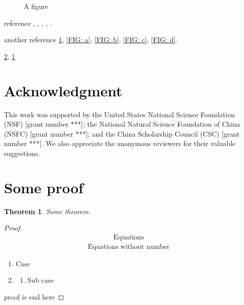 \documentclass[3p,review,a4paper]{elsarticle}
\newtheorem{theorem}{Theorem}
\begin{document}
\begin{figure}[!htp]
\begin{minipage}[b]{.235\textwidth}
{                                \label{FIG: d}
                                }
                \end{minipage}
        \caption{A figure 
        }
        \label{FIG: all}
\end{figure}

reference , , , , .

another reference \cref{FIG: all}, \cref{FIG: a}, \cref{FIG: b}, \cref{FIG: c}, \cref{FIG: d}.

\ref{POOF: name}, \cref{THEOREM: name}


\section{Acknowledgment}

This work was supported by 
the United States National Science Foundation (NSF) [grant number ***]; 
the National Natural Science Foundation of China (NSFC) [grant number ***]; 
and the China Scholarship Council (CSC) [grant number ***].
We also appreciate the anonymous reviewers for their valuable suggestions.

\appendix

\section{Some proof} \label{POOF: name}

\begin{theorem} \label{THEOREM: name}
        Some theorem.
\end{theorem}

\begin{proof}        
        \begin{align}
                \text{Equations}
        \end{align}
        \begin{align*}
                \text{Equations without number}
        \end{align*}
        \begin{enumerate}
                \item Case
                \item \label{case 2} 
                \begin{enumerate}
                        \item Sub case
                \end{enumerate}
        \end{enumerate}
        proof is end here
\end{proof}
\end{document}
